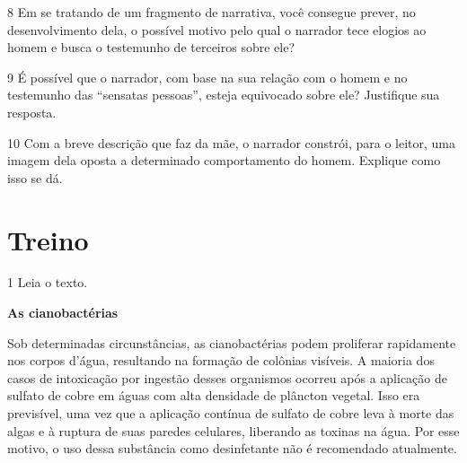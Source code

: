 
\num{8} Em se tratando de um fragmento de narrativa, você consegue
prever, no desenvolvimento dela, o possível motivo pelo qual o narrador
tece elogios ao homem e busca o testemunho de terceiros sobre ele?


\num{9} É possível que o narrador, com base na sua relação com o homem e
no testemunho das ``sensatas pessoas'', esteja equivocado sobre ele?
Justifique sua resposta.


\num{10} Com a breve descrição que faz da mãe, o narrador constrói, para
o leitor, uma imagem dela oposta a determinado comportamento do homem.
Explique como isso se dá.


\section*{Treino}

\num{1} Leia o texto.

\begin{myquote}
\textbf{As cianobactérias}

Sob determinadas circunstâncias, as cianobactérias podem proliferar
rapidamente nos corpos d'água, resultando na formação de colônias
visíveis. A maioria dos casos de intoxicação por ingestão desses
organismos ocorreu após a aplicação de sulfato de cobre em águas com
alta densidade de plâncton vegetal. Isso era previsível, uma vez que a
aplicação contínua de sulfato de cobre leva à morte das algas e à
ruptura de suas paredes celulares, liberando as toxinas na água. Por
esse motivo, o uso dessa substância como desinfetante não é recomendado
atualmente.

\end{myquote}

